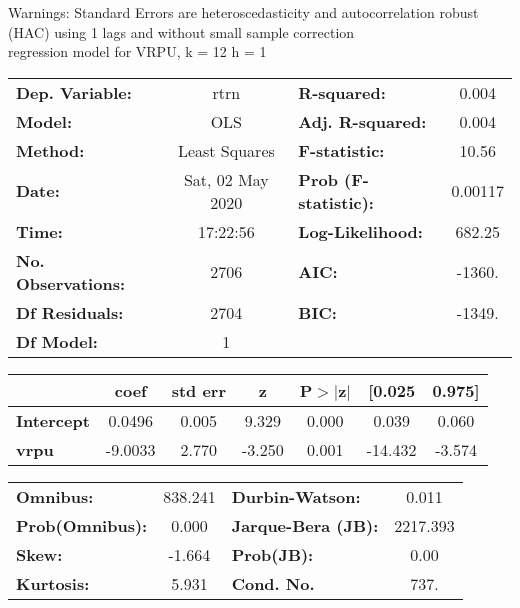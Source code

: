 Warnings: \newline
 [1] Standard Errors are heteroscedasticity and autocorrelation robust (HAC) using 1 lags and without small sample correction\\ 

regression model for VRPU, k = 12 h = 1\begin{center}
\begin{tabular}{lclc}
\toprule
\textbf{Dep. Variable:}    &       rtrn       & \textbf{  R-squared:         } &     0.004   \\
\textbf{Model:}            &       OLS        & \textbf{  Adj. R-squared:    } &     0.004   \\
\textbf{Method:}           &  Least Squares   & \textbf{  F-statistic:       } &     10.56   \\
\textbf{Date:}             & Sat, 02 May 2020 & \textbf{  Prob (F-statistic):} &  0.00117    \\
\textbf{Time:}             &     17:22:56     & \textbf{  Log-Likelihood:    } &    682.25   \\
\textbf{No. Observations:} &        2706      & \textbf{  AIC:               } &    -1360.   \\
\textbf{Df Residuals:}     &        2704      & \textbf{  BIC:               } &    -1349.   \\
\textbf{Df Model:}         &           1      & \textbf{                     } &             \\
\bottomrule
\end{tabular}
\begin{tabular}{lcccccc}
                   & \textbf{coef} & \textbf{std err} & \textbf{z} & \textbf{P$> |$z$|$} & \textbf{[0.025} & \textbf{0.975]}  \\
\midrule
\textbf{Intercept} &       0.0496  &        0.005     &     9.329  &         0.000        &        0.039    &        0.060     \\
\textbf{vrpu}      &      -9.0033  &        2.770     &    -3.250  &         0.001        &      -14.432    &       -3.574     \\
\bottomrule
\end{tabular}
\begin{tabular}{lclc}
\textbf{Omnibus:}       & 838.241 & \textbf{  Durbin-Watson:     } &    0.011  \\
\textbf{Prob(Omnibus):} &   0.000 & \textbf{  Jarque-Bera (JB):  } & 2217.393  \\
\textbf{Skew:}          &  -1.664 & \textbf{  Prob(JB):          } &     0.00  \\
\textbf{Kurtosis:}      &   5.931 & \textbf{  Cond. No.          } &     737.  \\
\bottomrule
\end{tabular}
\end{center}

